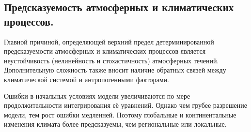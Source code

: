 \subsection{Предсказуемость атмосферных и климатических процессов.}
Главной причиной, определяющей верхний предел детерминированной предсказуемости атмосферных и климатических процессов является неустойчивость (нелинейность и стохастичность) атмосферных течений.
Дополнительную сложность также вносит наличие обратных связей между климатической системой и антропогенными факторами.

Ошибки в начальных условиях модели увеличиваются по мере продолжительности интегрирования её уравнений.
Однако чем грубее разрешение модели, тем рост ошибки медленней.
Поэтому глобальные и континентальные изменения климата более предсказуемы, чем региональные или локальные.
